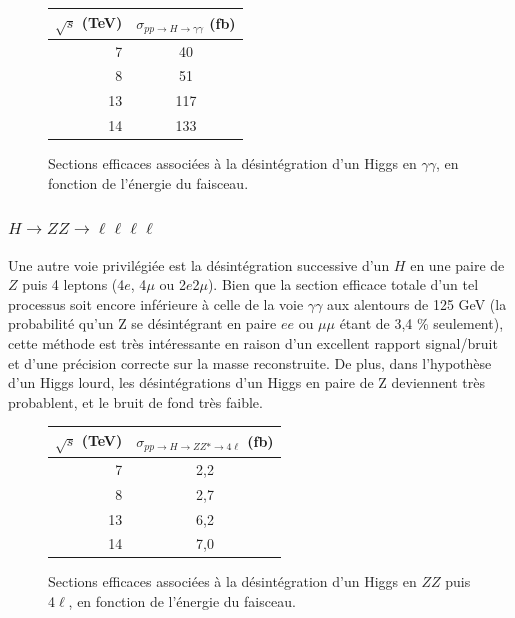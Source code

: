 \documentclass[11pt]{article} %
\begin{document}
\begin{figure}[H]
\centering
\begin{tabular}{|r|c|} 
   \hline
   $\sqrt{s}$ (TeV) & $\sigma_{pp \to H \to \gamma \gamma}$ (fb) \\
    \hline
   7 &  40\\
\hline
   8 & 51 \\
\hline
   13 & 117  \\
\hline
   14 & 133 \\
  \hline
\end{tabular}
\caption{Sections efficaces associées à la désintégration d'un Higgs en $\gamma \gamma$, en fonction de l'énergie du faisceau.}
\end{figure}



\subsubsection{$H \to ZZ \to \ell \ell \ell \ell$}

Une autre voie privilégiée est la désintégration successive d'un $H$ en une paire de $Z$ puis 4 leptons (4$e$, 4$\mu$ ou 2$e$2$\mu$). Bien que la section efficace totale d'un tel processus soit encore inférieure à celle de la voie $\gamma \gamma$ aux alentours de 125 GeV  (la probabilité qu'un Z se désintégrant en paire $ee$ ou $\mu \mu$ étant de 3,4 \% seulement), cette méthode est très intéressante en raison d'un excellent rapport signal/bruit et d'une précision correcte sur la masse reconstruite. De plus, dans l'hypothèse d'un Higgs lourd, les désintégrations d'un Higgs en paire de Z deviennent très probablent, et le bruit de fond très faible.

\begin{figure}[H]
\centering
\begin{tabular}{|r|c|} 
   \hline
   $\sqrt{s}$ (TeV) & $\sigma_{pp \to H \to ZZ* \to 4\ell}$ (fb) \\
    \hline
   7 &  2,2\\
\hline
   8 & 2,7 \\
\hline
   13 & 6,2  \\
\hline
   14 & 7,0 \\
  \hline
\end{tabular}
\caption{Sections efficaces associées à la désintégration d'un Higgs en $ZZ$ puis 4$\ell$, en fonction de l'énergie du faisceau.}
\end{figure}
\end{document}
